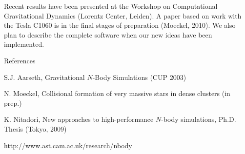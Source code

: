 \documentclass[12pt]{article}
\begin{document}
Recent results have been presented at the Workshop on Computational
Gravitational Dynamics (Lorentz Center, Leiden).
A paper based on work with the Tesla C1060 is in the final stages of
preparation (Moeckel, 2010).
We also plan to describe the complete software when our new ideas have
been implemented.

\bigskip
\noindent
References 

\noindent
S.J. Aarseth, Gravitational $N$-Body Simulations (CUP 2003)

\noindent
N. Moeckel, Collisional formation of very massive stars in dense clusters
(in prep.)

\noindent
K. Nitadori, New approaches to high-performance $N$-body simulations, Ph.D.
Thesis (Tokyo, 2009)

\noindent
http://www.ast.cam.ac.uk/research/nbody
\end{document}
